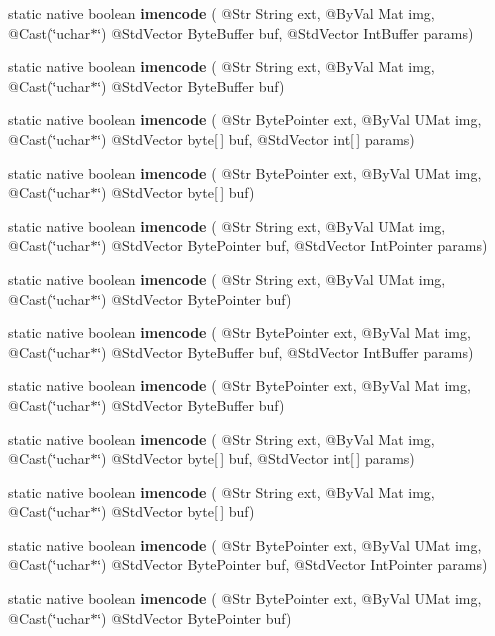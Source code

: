 \begin{DoxyCompactItemize}
static native boolean {\bfseries imencode} ( @Str String ext, @By\+Val Mat img, @Cast(\char`\"{}uchar$\ast$\char`\"{}) @Std\+Vector Byte\+Buffer buf, @Std\+Vector Int\+Buffer params)
\item 
static native boolean {\bfseries imencode} ( @Str String ext, @By\+Val Mat img, @Cast(\char`\"{}uchar$\ast$\char`\"{}) @Std\+Vector Byte\+Buffer buf)
\item 
static native boolean {\bfseries imencode} ( @Str Byte\+Pointer ext, @By\+Val U\+Mat img, @Cast(\char`\"{}uchar$\ast$\char`\"{}) @Std\+Vector byte\mbox{[}$\,$\mbox{]} buf, @Std\+Vector int\mbox{[}$\,$\mbox{]} params)
\item 
static native boolean {\bfseries imencode} ( @Str Byte\+Pointer ext, @By\+Val U\+Mat img, @Cast(\char`\"{}uchar$\ast$\char`\"{}) @Std\+Vector byte\mbox{[}$\,$\mbox{]} buf)
\item 
static native boolean {\bfseries imencode} ( @Str String ext, @By\+Val U\+Mat img, @Cast(\char`\"{}uchar$\ast$\char`\"{}) @Std\+Vector Byte\+Pointer buf, @Std\+Vector Int\+Pointer params)
\item 
static native boolean {\bfseries imencode} ( @Str String ext, @By\+Val U\+Mat img, @Cast(\char`\"{}uchar$\ast$\char`\"{}) @Std\+Vector Byte\+Pointer buf)
\item 
static native boolean {\bfseries imencode} ( @Str Byte\+Pointer ext, @By\+Val Mat img, @Cast(\char`\"{}uchar$\ast$\char`\"{}) @Std\+Vector Byte\+Buffer buf, @Std\+Vector Int\+Buffer params)
\item 
static native boolean {\bfseries imencode} ( @Str Byte\+Pointer ext, @By\+Val Mat img, @Cast(\char`\"{}uchar$\ast$\char`\"{}) @Std\+Vector Byte\+Buffer buf)
\item 
static native boolean {\bfseries imencode} ( @Str String ext, @By\+Val Mat img, @Cast(\char`\"{}uchar$\ast$\char`\"{}) @Std\+Vector byte\mbox{[}$\,$\mbox{]} buf, @Std\+Vector int\mbox{[}$\,$\mbox{]} params)
\item 
static native boolean {\bfseries imencode} ( @Str String ext, @By\+Val Mat img, @Cast(\char`\"{}uchar$\ast$\char`\"{}) @Std\+Vector byte\mbox{[}$\,$\mbox{]} buf)
\item 
static native boolean {\bfseries imencode} ( @Str Byte\+Pointer ext, @By\+Val U\+Mat img, @Cast(\char`\"{}uchar$\ast$\char`\"{}) @Std\+Vector Byte\+Pointer buf, @Std\+Vector Int\+Pointer params)
\item 
static native boolean {\bfseries imencode} ( @Str Byte\+Pointer ext, @By\+Val U\+Mat img, @Cast(\char`\"{}uchar$\ast$\char`\"{}) @Std\+Vector Byte\+Pointer buf)

\end{DoxyCompactItemize}
